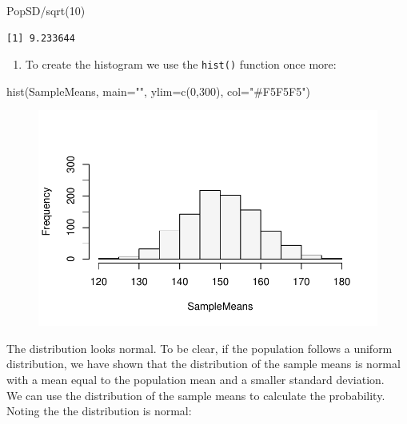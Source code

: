 \documentclass[
  letterpaper,
  DIV=11,
  numbers=noendperiod]{scrreprt}
\newenvironment{Shaded}{\begin{snugshade}}{\end{snugshade}}
\newcommand{\AttributeTok}[1]{\textcolor[rgb]{0.40,0.45,0.13}{#1}}
\newcommand{\DecValTok}[1]{\textcolor[rgb]{0.68,0.00,0.00}{#1}}
\newcommand{\FunctionTok}[1]{\textcolor[rgb]{0.28,0.35,0.67}{#1}}
\newcommand{\NormalTok}[1]{\textcolor[rgb]{0.00,0.23,0.31}{#1}}
\newcommand{\SpecialCharTok}[1]{\textcolor[rgb]{0.37,0.37,0.37}{#1}}
\newcommand{\StringTok}[1]{\textcolor[rgb]{0.13,0.47,0.30}{#1}}
\providecommand{\tightlist}{%
  \setlength{\itemsep}{0pt}\setlength{\parskip}{0pt}}\usepackage{longtable,booktabs,array}
\begin{document}
\begin{Shaded}
\begin{Highlighting}[numbers=left,,]
\NormalTok{PopSD}\SpecialCharTok{/}\FunctionTok{sqrt}\NormalTok{(}\DecValTok{10}\NormalTok{)}
\end{Highlighting}
\end{Shaded}

\begin{verbatim}
[1] 9.233644
\end{verbatim}

\begin{enumerate}
\def\labelenumi{\arabic{enumi}.}
\setcounter{enumi}{2}
\tightlist
\item
  To create the histogram we use the \texttt{hist()} function once more:
\end{enumerate}

\begin{Shaded}
\begin{Highlighting}[numbers=left,,]
\FunctionTok{hist}\NormalTok{(SampleMeans, }\AttributeTok{main=}\StringTok{""}\NormalTok{, }\AttributeTok{ylim=}\FunctionTok{c}\NormalTok{(}\DecValTok{0}\NormalTok{,}\DecValTok{300}\NormalTok{), }\AttributeTok{col=}\StringTok{"\#F5F5F5"}\NormalTok{)}
\end{Highlighting}
\end{Shaded}

\begin{figure}[H]

{\centering \includegraphics{./12-InferenceI_files/figure-pdf/unnamed-chunk-8-1.pdf}

}

\end{figure}

The distribution looks normal. To be clear, if the population follows a
uniform distribution, we have shown that the distribution of the sample
means is normal with a mean equal to the population mean and a smaller
standard deviation.\\
We can use the distribution of the sample means to calculate the
probability. Noting the the distribution is normal:
\end{document}
